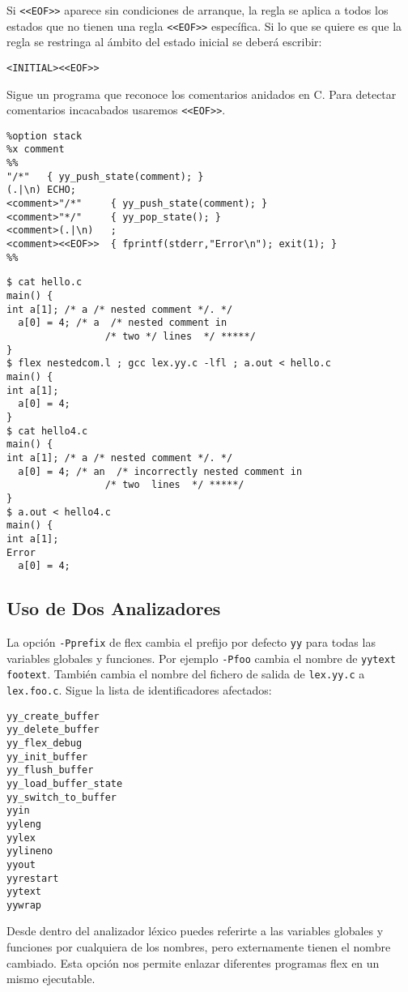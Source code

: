 Si  \verb|<<EOF>>| aparece sin condiciones de arranque, la regla se aplica a todos los estados que no tienen una regla  \verb|<<EOF>>| específica.
Si lo que se quiere es que la regla se restringa al ámbito del estado inicial se deberá escribir:

\verb|<INITIAL><<EOF>>| 

Sigue un programa que reconoce los comentarios anidados en C.
Para detectar comentarios incacabados usaremos  \verb|<<EOF>>|.
\label{nestedcomments}
\begin{verbatim}
%option stack
%x comment
%%
"/*"   { yy_push_state(comment); }
(.|\n) ECHO;
<comment>"/*"     { yy_push_state(comment); } 
<comment>"*/"     { yy_pop_state(); } 
<comment>(.|\n)   ;
<comment><<EOF>>  { fprintf(stderr,"Error\n"); exit(1); }
%%
\end{verbatim}

\begin{verbatim}
$ cat hello.c
main() {
int a[1]; /* a /* nested comment */. */
  a[0] = 4; /* a  /* nested comment in
                 /* two */ lines  */ *****/
}                                                   
$ flex nestedcom.l ; gcc lex.yy.c -lfl ; a.out < hello.c
main() {
int a[1];
  a[0] = 4;
}
$ cat hello4.c
main() {
int a[1]; /* a /* nested comment */. */
  a[0] = 4; /* an  /* incorrectly nested comment in
                 /* two  lines  */ *****/
}
$ a.out < hello4.c
main() {
int a[1];
Error
  a[0] = 4; 
\end{verbatim}

\subsection{Uso de Dos Analizadores}
La opción \verb|-Pprefix| de flex cambia el prefijo por defecto \verb|yy|
para todas las variables globales y funciones. Por ejemplo 
\verb|-Pfoo| cambia el nombre de  \verb|yytext| \verb|footext|.  
También cambia el nombre del fichero de salida 
de  \verb|lex.yy.c|  a \verb|lex.foo.c|.  
Sigue la lista de identificadores afectados:
\begin{verbatim} 
yy_create_buffer
yy_delete_buffer
yy_flex_debug
yy_init_buffer
yy_flush_buffer
yy_load_buffer_state
yy_switch_to_buffer
yyin
yyleng
yylex
yylineno
yyout
yyrestart
yytext
yywrap
\end{verbatim} 
Desde dentro del analizador léxico puedes referirte a las 
variables globales y funciones por cualquiera de los nombres,
pero externamente tienen el nombre cambiado.
Esta opción nos permite enlazar diferentes programas flex en un mismo ejecutable.

